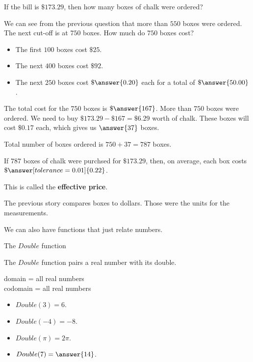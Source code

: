 \documentclass{ximera}
\begin{document}
\begin{question} 


If the bill is $\$173.29$, then how many boxes of chalk were ordered?



We can see from the previous question that more than $550$ boxes were ordered.  The next cut-off is at $750$ boxes.  How much do $750$ boxes cost? 

\begin{itemize}
\item The first $100$ boxes cost $\$25$.
\item The next $400$ boxes cost $\$92$.
\item The next $250$ boxes cost $\$\answer{0.20}$ each for a total of $\$\answer{50.00}$.
\end{itemize}
The total cost for the $750$ boxes is $\$\answer{167}$. More than $750$ boxes were ordered.  We need to buy $\$173.29 - \$167 = \$6.29$ worth of chalk.  These boxes will cost $\$0.17$ each, which gives us $\answer{37}$ boxes.  


Total number of boxes ordered is $750 + 37 = 787$ boxes.


\end{question}



\begin{question} 


If $787$ boxes of chalk were purchsed for $\$173.29$, then, on average, each box costs $\$\answer[tolerance=0.01]{0.22}$. 

This is called the \textbf{effective price}.
\end{question}



The previous story compares boxes to dollars.  Those were the units for the measurements. 



We can also have functions that just relate numbers. 







\begin{example} The $Double$ function

The $Double$ function pairs a real number with its double.

domain = all real numbers  \\ 
codomain = all real numbers


\begin{itemize}
\item $Double(3) = 6$.
\item $Double(-4) = -8$.
\item $Double(\pi) = 2 \pi$.

\item $Double(7) = \answer{14}$.
\end{itemize}
\end{example} 
\end{document}
